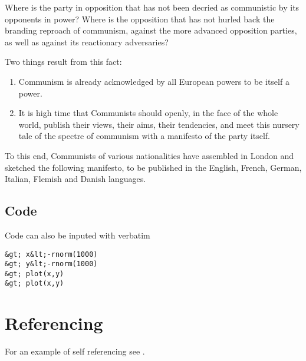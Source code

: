 \documentclass[11pt]{article}
\begin{document}
Where is the party in opposition that has not been decried as communistic by its opponents in power? Where is the opposition that has not hurled back the branding reproach of communism, against the more advanced opposition parties, as well as against its reactionary adversaries?
\par                 %
Two things result from this fact:
\begin{enumerate}
    \item Communism is already acknowledged by all European powers to be itself a power.

    \item It is high time that Communists should openly, in the face of the whole world, publish their views, their aims, their tendencies, and meet this nursery tale of the spectre of communism with a manifesto of the party itself.
\end{enumerate}
To this end, Communists of various nationalities have assembled in London and sketched the following manifesto, to be published in the English, French, German, Italian, Flemish and Danish languages.

\subsection{Code}
Code can also be inputed with verbatim
\begin{verbatim}
&gt; x&lt;-rnorm(1000)
&gt; y&lt;-rnorm(1000)
&gt; plot(x,y)
&gt; plot(x,y)
\end{verbatim}

\section{Referencing}
For an example of self referencing see \cite{tuke2008}.



\end{document}

